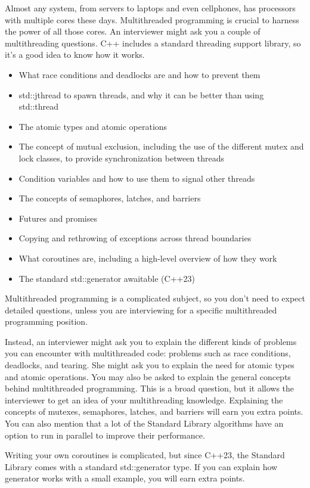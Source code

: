
Almost any system, from servers to laptops and even cellphones, has processors with multiple cores these days. Multithreaded programming is crucial to harness the power of all those cores. An interviewer might ask you a couple of multithreading questions. C++ includes a standard threading support library, so it’s a good idea to know how it works.


\begin{itemize}
\item
What race conditions and deadlocks are and how to prevent them

\item
std::jthread to spawn threads, and why it can be better than using std::thread

\item
The atomic types and atomic operations

\item
The concept of mutual exclusion, including the use of the different mutex and lock classes, to provide synchronization between threads

\item
Condition variables and how to use them to signal other threads

\item
The concepts of semaphores, latches, and barriers

\item
Futures and promises

\item
Copying and rethrowing of exceptions across thread boundaries

\item
What coroutines are, including a high-level overview of how they work

\item
The standard std::generator awaitable (C++23)
\end{itemize}


Multithreaded programming is a complicated subject, so you don’t need to expect detailed questions, unless you are interviewing for a specific multithreaded programming position.

Instead, an interviewer might ask you to explain the different kinds of problems you can encounter with multithreaded code: problems such as race conditions, deadlocks, and tearing. She might ask you to explain the need for atomic types and atomic operations. You may also be asked to explain the general concepts behind multithreaded programming. This is a broad question, but it allows the interviewer to get an idea of your multithreading knowledge. Explaining the concepts of mutexes, semaphores, latches, and barriers will earn you extra points. You can also mention that a lot of the Standard Library algorithms have an option to run in parallel to improve their performance.

Writing your own coroutines is complicated, but since C++23, the Standard Library comes with a standard std::generator type. If you can explain how generator works with a small example, you will earn extra points.


